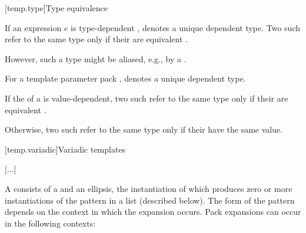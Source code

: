 \documentclass{wg21}
\begin{document}
%
%
\begin{bnf}
    \br
    \br
    \br
\end{bnf}


[temp.type]{Type equivalence}

\pnum
If an expression $e$ is type-dependent ,
denotes a unique dependent type. Two such 
refer to the same type only if their  are
equivalent .
\begin{note} %
    However, such a type might be aliased,
    e.g., by a .
\end{note}

\begin{addedblock}
For a template parameter pack ,  denotes a unique dependent type.

If the  of a  is value-dependent, two such  refer to the same type only if their  are equivalent .

Otherwise, two such  refer to the same type only if their  have the same value.

\end{addedblock}

[temp.variadic]{Variadic templates}

\textcolor{noteclr}{[...]}

\pnum
{}%
A 
consists of a  and an ellipsis, the instantiation of which
produces zero or more instantiations of the pattern in a list (described below).
The form of the pattern
depends on the context in which the expansion occurs. Pack
expansions can occur in the following contexts:
\end{document}
